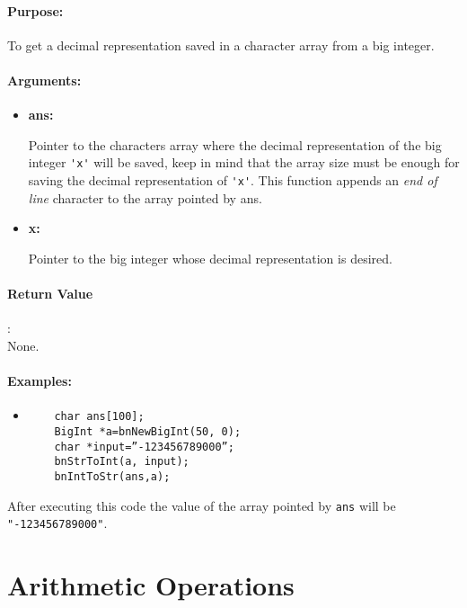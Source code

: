 \documentclass{book}
\begin{document}
\paragraph{Purpose:} 

To get a decimal representation saved in a character array from a big integer.

\paragraph{Arguments:}

\begin{itemize}
\item{\bf ans:}

Pointer to the characters array where the decimal representation of the big integer \verb+'x'+ will be saved, keep in mind that the array size must be enough for saving the decimal representation of \verb+'x'+. This  function appends an \emph{end of line} character to the array pointed by ans.

\item {\bf x:}

Pointer to the big integer whose decimal representation is desired.

\end{itemize}

\paragraph{Return Value}:\\

None.

\paragraph{Examples:}

\begin{itemize}
\item

\begin{verbatim}
	char ans[100];
	BigInt *a=bnNewBigInt(50, 0);
	char *input=”-123456789000”;
	bnStrToInt(a, input);
	bnIntToStr(ans,a);
\end{verbatim}
\end{itemize}

After executing this code the value of the array pointed by \verb+ans+ will be \verb+"-123456789000"+.

\section{Arithmetic Operations}
\end{document}
